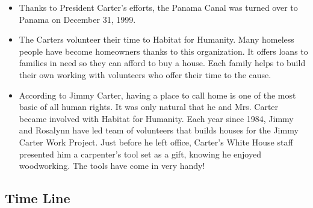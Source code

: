 \documentclass{article}
\begin{document}
\begin{itemize}
\item Thanks to President Carter's efforts, the Panama Canal was turned over to Panama on December 31, 1999.

\item The Carters volunteer their time to Habitat for Humanity. Many homeless people have become homeowners thanks to this organization. It offers loans to families in need so they can afford to buy a house. Each family helps to build their own working with volunteers who offer their time to the cause.

\item According to Jimmy Carter, having a place to call home is one of the most basic of all human rights. It was only natural that he and Mrs. Carter became involved with Habitat for Humanity. Each year since 1984, Jimmy and Rosalynn have led team of volunteers that builds houses for the Jimmy Carter Work Project. Just before he left office, Carter's White House staff presented him a carpenter's tool set as a gift, knowing he enjoyed woodworking. The tools have come in very handy!  
\end{itemize}

\subsection*{Time Line}
\end{document}
